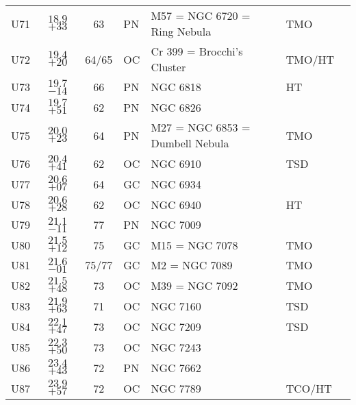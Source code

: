 \begin{table}[p]
\begin{tabular}{lccllll}
U71 &$18.9$ $+33$&63&PN &M57 = NGC 6720 = Ring Nebula& TMO \\
U72 &$19.4$ $+20$&64/65&OC &Cr 399 = Brocchi's Cluster& TMO/HT  \\
U73 &$19.7$ $-14$&66&PN &NGC 6818& HT  \\
U74 &$19.7$ $+51$&62&PN &NGC 6826&  \\
U75 &$20.0$ $+23$&64&PN &M27 = NGC 6853 = Dumbell Nebula& TMO \\
U76 &$20.4$ $+41$&62&OC &NGC 6910& TSD \\
U77 &$20.6$ $+07$&64&GC &NGC 6934&  \\
U78 &$20.6$ $+28$&62&OC &NGC 6940& HT  \\
U79 &$21.1$ $-11$&77&PN &NGC 7009&  \\
U80 &$21.5$ $+12$&75&GC &M15 = NGC 7078& TMO \\
U81 &$21.6$ $-01$&75/77&GC &M2 = NGC 7089& TMO \\
U82 &$21.5$ $+48$&73&OC &M39 = NGC 7092& TMO \\
U83 &$21.9$ $+63$&71&OC &NGC 7160& TSD \\
U84 &$22.1$ $+47$&73&OC &NGC 7209& TSD \\
U85 &$22.3$ $+50$&73&OC &NGC 7243&  \\
U86 &$23.4$ $+43$&72&PN &NGC 7662&  \\
U87 &$23.9$ $+57$&72&OC &NGC 7789& TCO/HT  \\
\hline
\end{tabular}
\end{table}

\clearpage

\twocolumn


\onecolumn

